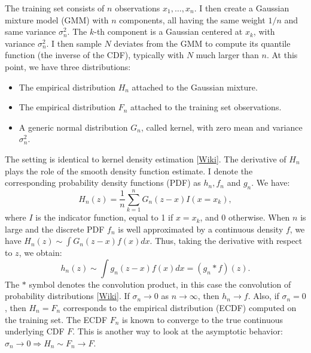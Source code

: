 \documentclass[oneside,10pt]{book}
\begin{document}
The training set consists of
 $n$ observations $x_1,\dots, x_n$. I then create a \textcolor{index}{Gaussian mixture model} (GMM)
 with $n$ components, all having the same weight $1/n$ and same variance $\sigma^2_n$.
The $k$-th component is a Gaussian centered at $x_k$, with variance $\sigma^2_n$. I then sample $N$ deviates from the GMM to compute its \textcolor{index}{quantile function} (the inverse of the CDF), typically with $N$ much larger
 than $n$. At this point, we have three distributions:\vspace{1ex}

\begin{itemize}
\item The empirical distribution $H_n$ attached to the Gaussian mixture.
\item The empirical distribution $F_n$ attached to the training set observations.
\item A generic normal distribution $G_n$, called \textcolor{index}{kernel}, with zero mean and variance  $\sigma_n^2$.
\end{itemize}
\vspace{1ex}
\noindent The setting is identical to
\textcolor{index}{kernel density estimation} [\href{https://en.wikipedia.org/wiki/Kernel_density_estimation}{Wiki}]. The derivative of $H_n$ plays the role of the smooth density function estimate. I denote the corresponding
\textcolor{index}{probability density functions} (PDF) as
 $h_n, f_n$ and $g_n$. We have:
\begin{equation}
H_n( z) = \frac{1}{n}\sum_{k=1}^n G_n(z-x) I(x = x_k), \label{qeq1}
\end{equation}
where $I$ is the indicator function, equal to 1 if $x=x_k$, and 0 otherwise. When $n$ is large and
 the discrete PDF $f_n$ is well approximated by a continuous density $f$, we have
$H_n(z) \sim \int G_n(z-x) f(x) dx$. Thus, taking the derivative with respect to $z$, we obtain:
\begin{equation}
h_n(z) \sim \int g_n(z-x)f(x) dx = (g_n * f)(z). \label{qeq2}
\end{equation}
The $*$ symbol denotes the \textcolor{index}{convolution product}, in this case
the convolution of probability distributions [\href{https://en.wikipedia.org/wiki/Convolution_of_probability_distributions}{Wiki}]. If $\sigma_n\rightarrow 0$ as $n\rightarrow\infty$,
 then $h_n\rightarrow f$. Also, if $\sigma_n = 0$, then $H_n = F_n$ corresponds to the empirical
 distribution (ECDF) computed on the training set. The ECDF $F_n$ is known to converge to the true
 continuous underlying CDF $F$. This is another way to look at the asymptotic behavior:
 $\sigma_n \rightarrow 0 \Rightarrow H_n \sim F_n \rightarrow F$.
\end{document}
